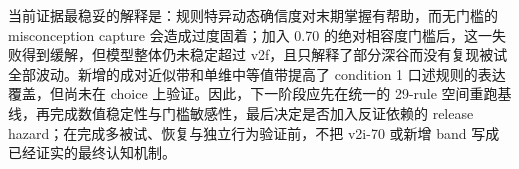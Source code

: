 当前证据最稳妥的解释是：规则特异动态确信度对末期掌握有帮助，而无门槛的 misconception capture 会造成过度固着；加入 0.70 的绝对相容度门槛后，这一失败得到缓解，但模型整体仍未稳定超过 v2f，且只解释了部分深谷而没有复现被试全部波动。新增的成对近似带和单维中等值带提高了 condition 1 口述规则的表达覆盖，但尚未在 choice 上验证。因此，下一阶段应先在统一的 29-rule 空间重跑基线，再完成数值稳定性与门槛敏感性，最后决定是否加入反证依赖的 release hazard；在完成多被试、恢复与独立行为验证前，不把 v2i-70 或新增 band 写成已经证实的最终认知机制。

